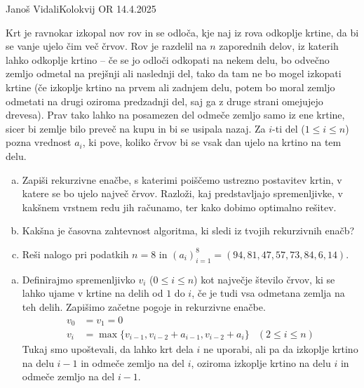 \begin{naloga}{Janoš Vidali}{Kolokvij OR 14.4.2025}
\begin{vprasanje}
Krt je ravnokar izkopal nov rov in se odloča,
kje naj iz rova odkoplje krtine, da bi se vanje ujelo čim več črvov.
Rov je razdelil na $n$ zaporednih delov, iz katerih lahko odkoplje krtino
-- če se jo odloči odkopati na nekem delu,
bo odvečno zemljo odmetal na prejšnji ali naslednji del,
tako da tam ne bo mogel izkopati krtine
(če izkoplje krtino na prvem ali zadnjem delu,
potem bo moral zemljo odmetati na drugi oziroma predzadnji del,
saj ga z druge strani omejujejo drevesa).
Prav tako lahko na posamezen del odmeče zemljo samo iz ene krtine,
sicer bi zemlje bilo preveč na kupu in bi se usipala nazaj.
Za $i$-ti del ($1 \le i \le n$) pozna vrednost $a_i$,
ki pove, koliko črvov bi se vsak dan ujelo na krtino na tem delu.


\begin{enumerate}[(a)]
\item Zapiši rekurzivne enačbe,
s katerimi poiščemo ustrezno postavitev krtin,
v katere se bo ujelo največ črvov.
Razloži, kaj predstavljajo spremenljivke,
v kakšnem vrstnem redu jih računamo, ter kako dobimo optimalno rešitev.

\item Kakšna je časovna zahtevnost algoritma,
ki sledi iz tvojih rekurzivnih enačb?

\item Reši nalogo pri podatkih $n = 8$
in $(a_i)_{i=1}^8 = (94, 81, 47, 57, 73, 84, 6, 14)$.
\end{enumerate}
\end{vprasanje}

\begin{odgovor}
\begin{enumerate}[(a)]
\item Definirajmo spremenljivko $v_i$ ($0 \le i \le n$)
kot največje število črvov,
ki se lahko ujame v krtine na delih od $1$ do $i$,
če je tudi vsa odmetana zemlja na teh delih.
Zapišimo začetne pogoje in rekurzivne enačbe.
\begin{align*}
v_0 &= v_1 = 0 \\
v_i &= \max\{v_{i-1}, v_{i-2} + a_{i-1}, v_{i-2} + a_i\}
 & (2 \le i \le n)
\end{align*}
Tukaj smo upoštevali, da lahko krt dela $i$ ne uporabi,
ali pa da izkoplje krtino na delu $i-1$ in odmeče zemljo na del $i$,
oziroma izkoplje krtino na delu $i$ in odmeče zemljo na del $i-1$.


\end{enumerate}
\end{odgovor}
\end{naloga}
